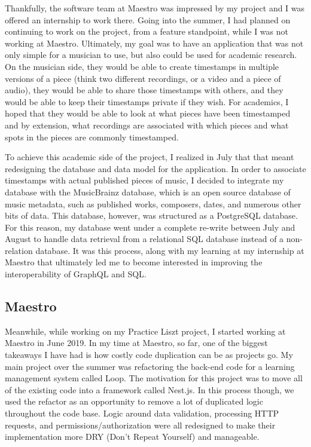 Thankfully, the software team at Maestro was impressed by my project and I was offered an internship to work there. Going into the summer, I had planned on continuing to work on the project, from a feature standpoint, while I was not working at Maestro.  Ultimately, my goal was to have an application that was not only simple for a musician to use, but also could be used for academic research. On the musician side, they would be able to create timestamps in multiple versions of a piece (think two different recordings, or a video and a piece of audio), they would be able to share those timestamps with others, and they would be able to keep their timestamps private if they wish.  For academics, I hoped that they would be able to look at what pieces have been timestamped and by extension, what recordings are associated with which pieces and what spots in the pieces are commonly timestamped.

To achieve this academic side of the project, I realized in July that that meant redesigning the database and data model for the application.  In order to associate timestamps with actual published pieces of music, I decided to integrate my database with the MusicBrainz database, which is an open source database of music metadata, such as published works, composers, dates, and numerous other bits of data.  This database, however, was structured as a PostgreSQL database.  For this reason, my database went under a complete re-write between July and August to handle data retrieval from a relational SQL database instead of a non-relation database.  It was this process, along with my learning at my internship at Maestro that ultimately led me to become interested in improving the interoperability of GraphQL and SQL.

\subsection{Maestro}
Meanwhile, while working on my Practice Liszt project, I started working at Maestro in June 2019.  In my time at Maestro, so far, one of the biggest takeaways I have had is how costly code duplication can be as projects go.  My main project over the summer was refactoring the back-end code for a learning management system called Loop.  The motivation for this project was to move all of the existing code into a framework called Nest.js.  In this process though, we used the refactor as an opportunity to remove a lot of duplicated logic throughout the code base.  Logic around data validation, processing HTTP requests, and permissions/authorization were all redesigned to make their implementation more DRY (Don't Repeat Yourself) and manageable.

